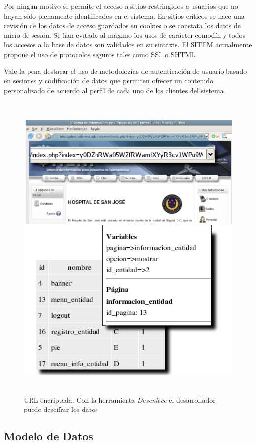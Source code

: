 Por ningún motivo se permite el acceso a sitios restringidos a usuarios que no hayan sido plenamente identificados en el sistema. En sitios críticos se hace una revisión de los datos de acceso guardados en cookies o se constata los datos de inicio de sesión. Se han evitado al máximo los usos de carácter comodín y todos los accesos a la base de datos son validados en su sintaxis. El SITEM actualmente propone el uso de protocolos seguros tales como SSL o SHTML.

Vale la pena destacar el uso de metodologías de autenticación de usuario basado en sesiones y codificación de datos que permiten ofrecer un contenido personalizado de acuerdo al perfil de cada uno de los clientes del sistema.

\begin{figure}
 \centering
 \includegraphics[width=156mm, height=156mm]{desenlace.png}
 \caption{URL encriptada. Con la herramienta \textit{Desenlace} el desarrollador puede descifrar los datos}
 \label{desenlace}
\end{figure}


\subsection{Modelo de Datos}

